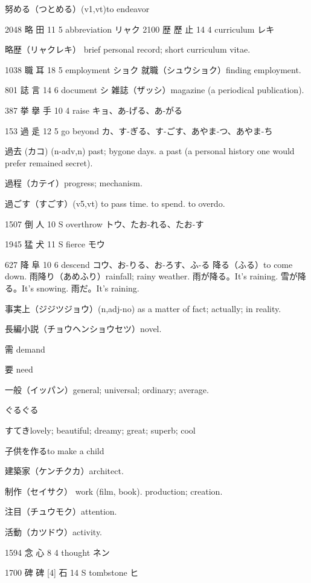 努める（つとめる）(v1,vt)to endeavor

2048	略		田	11	5		abbreviation	リャク
2100	歴	歷	止	14	4		curriculum	レキ

略歴（リャクレキ）
brief personal record;
short curriculum vitae.

1038	職		耳	18	5		employment	ショク
就職（シュウショク）finding employment.

801	誌		言	14	6		document	シ
雑誌（ザッシ）magazine (a periodical publication).

387	挙	擧	手	10	4		raise	キョ、あ-げる、あ-がる

153	過		辵	12	5		go beyond	カ、す-ぎる、す-ごす、あやま-つ、あやま-ち

過去 (カコ) (n-adv,n)
past; bygone days.
a past (a personal history one would prefer remained secret).

過程（カテイ）progress; mechanism.

過ごす（すごす）(v5,vt) to pass time. to spend. to overdo.

1507	倒		人	10	S		overthrow	トウ、たお-れる、たお-す

1945	猛		犬	11	S		fierce	モウ

627	降		阜	10	6		descend	コウ、お-りる、お-ろす、ふ-る
降る（ふる）to come down.
雨降り（あめふり）rainfall; rainy weather.
雨が降る。It's raining.
雪が降る。It's snowing.
雨だ。It's raining.

事実上（ジジツジョウ）(n,adj-no)
as a matter of fact; actually; in reality.

長編小説（チョウヘンショウセツ）novel.

需 demand

要 need

一般（イッパン）general; universal; ordinary; average.

ぐるぐる

すてきlovely; beautiful; dreamy; great; superb; cool


子供を作るto make a child

建築家（ケンチクカ）architect.

制作（セイサク）
work (film, book).
production; creation.

注目（チュウモク）attention.

活動（カツドウ）activity.

1594	念		心	8	4		thought	ネン

1700	碑	碑 [4]	石	14	S		tombstone	ヒ

